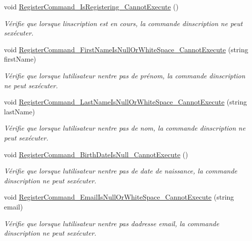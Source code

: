 \begin{DoxyCompactItemize}
void \hyperlink{class_boxes_1_1_tests_1_1_register_view_model_tests_ae4143feab955f532160cc36f943f2645}{Register\+Command\+\_\+\+Is\+Registering\+\_\+\+Cannot\+Execute} ()
\begin{DoxyCompactList}\small\item\em Vérifie que lorsque l\textquotesingle{}inscription est en cours, la commande d\textquotesingle{}inscription ne peut s\textquotesingle{}exécuter. \end{DoxyCompactList}\item 
void \hyperlink{class_boxes_1_1_tests_1_1_register_view_model_tests_a1a773d94a57e92810afca4de22d09f04}{Register\+Command\+\_\+\+First\+Name\+Is\+Null\+Or\+White\+Space\+\_\+\+Cannot\+Execute} (string first\+Name)
\begin{DoxyCompactList}\small\item\em Vérifie que lorsque l\textquotesingle{}utilisateur n\textquotesingle{}entre pas de prénom, la commande d\textquotesingle{}inscription ne peut s\textquotesingle{}exécuter. \end{DoxyCompactList}\item 
void \hyperlink{class_boxes_1_1_tests_1_1_register_view_model_tests_acb8965be90f1c2ffebd2d3ddfd11ca29}{Register\+Command\+\_\+\+Last\+Name\+Is\+Null\+Or\+White\+Space\+\_\+\+Cannot\+Execute} (string last\+Name)
\begin{DoxyCompactList}\small\item\em Vérifie que lorsque l\textquotesingle{}utilisateur n\textquotesingle{}entre pas de nom, la commande d\textquotesingle{}inscription ne peut s\textquotesingle{}exécuter. \end{DoxyCompactList}\item 
void \hyperlink{class_boxes_1_1_tests_1_1_register_view_model_tests_a2c365b78cd19824f6ed8427dd7646985}{Register\+Command\+\_\+\+Birth\+Date\+Is\+Null\+\_\+\+Cannot\+Execute} ()
\begin{DoxyCompactList}\small\item\em Vérifie que lorsque l\textquotesingle{}utilisateur n\textquotesingle{}entre pas de date de naissance, la commande d\textquotesingle{}inscription ne peut s\textquotesingle{}exécuter. \end{DoxyCompactList}\item 
void \hyperlink{class_boxes_1_1_tests_1_1_register_view_model_tests_acb1b3f1f6282077c2bcc4d061cca2111}{Register\+Command\+\_\+\+Email\+Is\+Null\+Or\+White\+Space\+\_\+\+Cannot\+Execute} (string email)
\begin{DoxyCompactList}\small\item\em Vérifie que lorsque l\textquotesingle{}utilisateur n\textquotesingle{}entre pas d\textquotesingle{}adresse email, la commande d\textquotesingle{}inscription ne peut s\textquotesingle{}exécuter. \end{DoxyCompactList}\item 

\end{DoxyCompactItemize}

